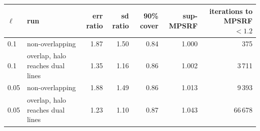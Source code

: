 \begin{tabular}{llrrrrr}
\toprule
$\ell$ & run & err ratio & sd ratio & 90\% cover & sup-MPSRF & iterations to MPSRF $<1.2$ \\
\midrule
0.1 & non-overlapping & 1.87 & 1.50 & 0.84 & 1.000 & 375 \\
0.1 & overlap, halo reaches dual lines & 1.35 & 1.16 & 0.86 & 1.002 & 3\,711 \\
0.05 & non-overlapping & 1.88 & 1.49 & 0.86 & 1.013 & 9\,393 \\
0.05 & overlap, halo reaches dual lines & 1.23 & 1.10 & 0.87 & 1.043 & 66\,678 \\
\bottomrule
\end{tabular}
